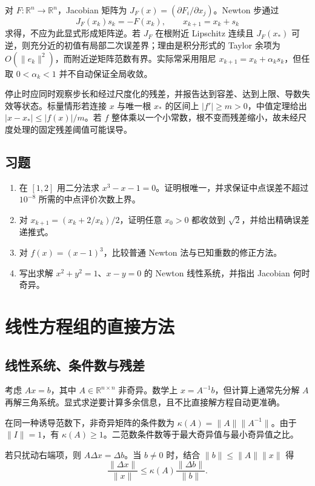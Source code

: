 \documentclass[UTF8,12pt,a4paper,fontset=fandol]{ctexbook}
\begin{document}
对 $F:\mathbb R^n\to\mathbb R^n$，Jacobian 矩阵为 $J_F(x)=(\partial F_i/\partial x_j)$。Newton 步通过
\[
 J_F(x_k)s_k=-F(x_k),\qquad x_{k+1}=x_k+s_k
\]
求得，不应为此显式形成矩阵逆。若 $J_F$ 在根附近 Lipschitz 连续且 $J_F(x_*)$ 可逆，则充分近的初值有局部二次误差界；理由是积分形式的 Taylor 余项为 $O(\|e_k\|^2)$，而附近逆矩阵范数有界。实际常采用阻尼 $x_{k+1}=x_k+\alpha_ks_k$，但任取 $0<\alpha_k<1$ 并不自动保证全局收敛。

停止时应同时观察步长和经过尺度化的残差，并报告达到容差、达到上限、导数失效等状态。标量情形若连接 $x$ 与唯一根 $x_*$ 的区间上 $|f'|\ge m>0$，中值定理给出 $|x-x_*|\le|f(x)|/m$。若 $f$ 整体乘以一个小常数，根不变而残差缩小，故未经尺度处理的固定残差阈值可能误导。

\section{习题}
\begin{enumerate}[label=\arabic*.]
\item\label{exr:na-root-bisect} 在 $[1,2]$ 用二分法求 $x^3-x-1=0$。证明根唯一，并求保证中点误差不超过 $10^{-8}$ 所需的中点评价次数上界。
\item\label{exr:na-root-fixed} 对 $x_{k+1}=(x_k+2/x_k)/2$，证明任意 $x_0>0$ 都收敛到 $\sqrt2$，并给出精确误差递推式。
\item\label{exr:na-root-multiple} 对 $f(x)=(x-1)^3$，比较普通 Newton 法与已知重数的修正方法。
\item\label{exr:na-root-system} 写出求解 $x^2+y^2=1$、$x-y=0$ 的 Newton 线性系统，并指出 Jacobian 何时奇异。
\end{enumerate}

\chapter{线性方程组的直接方法}
\label{chap:na-direct}

\section{线性系统、条件数与残差}
考虑 $Ax=b$，其中 $A\in\mathbb R^{n\times n}$ 非奇异。数学上 $x=A^{-1}b$，但计算上通常先分解 $A$ 再解三角系统。显式求逆要计算多余信息，且不比直接解方程自动更准确。

\begin{definition}[矩阵条件数]
在同一种诱导范数下，非奇异矩阵的条件数为 $\kappa(A)=\|A\|\|A^{-1}\|$。由于 $\|I\|=1$，有 $\kappa(A)\ge1$。二范数条件数等于最大奇异值与最小奇异值之比。
\end{definition}
若只扰动右端项，则 $A\Delta x=\Delta b$。当 $b\ne0$ 时，结合 $\|b\|\le\|A\|\|x\|$ 得
\begin{equation}
 \frac{\|\Delta x\|}{\|x\|}\le\kappa(A)\frac{\|\Delta b\|}{\|b\|}.
 \label{eq:na-rhs-perturbation}
\end{equation}
\end{document}
